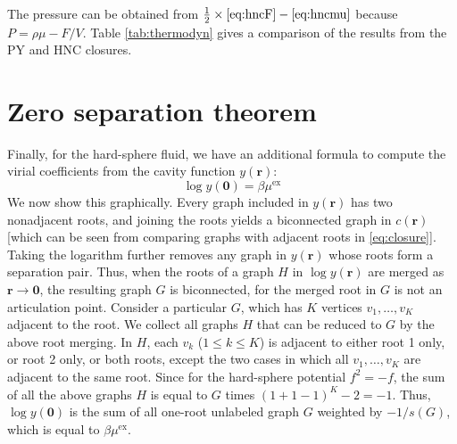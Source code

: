 \documentclass[notitlepage,preprint]{revtex4-1}
\newcommand{\vct}[1]{\mathbf{#1}}
\providecommand{\vr}{} %
\renewcommand{\vr}{\vct{r}}
\newcommand{\supex}[1]{ { { #1 }^{ \mathrm{ex} } } }
\newcommand{\muex}{\supex{\mu}}
\begin{document}
The pressure can be obtained from
  $\frac{1}{2} \times \eqref{eq:hncF} - \eqref{eq:hncmu}$
  because $P = \rho \mu - F/V$.
%
Table \ref{tab:thermodyn} gives
  a comparison of the results from the PY and HNC closures.






\section{Zero separation theorem}

Finally, for the hard-sphere fluid, we have an additional
  formula to compute the virial coefficients
  from the cavity function $y(\vr)$\cite{hoover1962}:
%
\begin{equation}
  \log y(\vct0) = \beta \muex
  \label{eq:zerosephoover}
\end{equation}
%
We now show this graphically.
%
Every graph included in $y(\vr)$
  has two nonadjacent roots\cite{hansen},
%
  and joining the roots
  yields a biconnected graph in $c(\vr)$
  [which can be seen from comparing graphs
  with adjacent roots in \eqref{eq:closure}].
%
Taking the logarithm further
  removes any graph in $y(\vr)$
  whose roots form
  a separation pair\cite{hansen}.
%
Thus, when the roots of a graph $H$ in $\log y(\vr)$
  are merged as $\vr \rightarrow \vct0$,
  the resulting graph $G$ is biconnected,
  for the merged root in $G$ is not an articulation point.
%
Consider a particular $G$,
  which has $K$ vertices $v_1, \dots, v_K$ adjacent to the root.
%
We collect all graphs $H$ that can be reduced to $G$
  by the above root merging.
%
In $H$, each $v_k$ ($1 \le k \le K$) is adjacent to
  either root 1 only,
  or root 2 only,
  or both roots,
  except the two cases in which all $v_1, \dots, v_K$ are adjacent to the same root.
%
Since for the hard-sphere potential $f^2 = -f$,
%
the sum of all the above graphs $H$
  is equal to $G$ times $(1 + 1 - 1)^K - 2 = -1$.
%
Thus, $\log y(\vct0)$ is the sum of all
  one-root unlabeled graph $G$ weighted by $-1/s(G)$,
  which is equal to $\beta \muex$.




\end{document}
